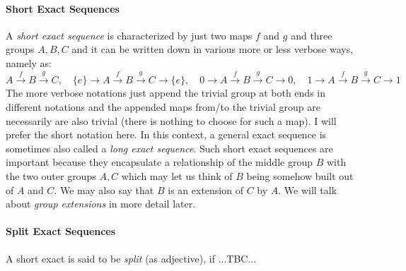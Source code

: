 

\paragraph{Short Exact Sequences}
A \emph{short exact sequence} is characterized by just two maps $f$ and $g$ and three groups $A,B,C$ and it can be written down in various more or less verbose ways, namely as:
\begin{equation}
 A \xrightarrow{f} B \xrightarrow{g} C,
 \quad 
 \{e\} \xrightarrow{} A \xrightarrow{f} B \xrightarrow{g} C \xrightarrow{} \{e\},
 \quad 
 0 \xrightarrow{} A \xrightarrow{f} B \xrightarrow{g} C \xrightarrow{} 0,
 \quad
 1 \xrightarrow{} A \xrightarrow{f} B \xrightarrow{g} C \xrightarrow{} 1
\end{equation}
The more verbose notations just append the trivial group at both ends in different notations and the appended maps from/to the trivial group are necessarily are also trivial (there is nothing to choose for such a map). I will prefer the short notation here. In this context, a general exact sequence is sometimes also called a \emph{long exact sequence}. Such short exact sequences are important because they encapsulate a relationship of the middle group $B$ with the two outer groups $A,C$ which may let us think of $B$ being somehow built out of $A$ and $C$. We may also say that $B$ is an extension of $C$ by $A$. We will talk about \emph{group extensions} in more detail later.



\paragraph{Split Exact Sequences}
A short exact is said to be \emph{split} (as adjective), if ...TBC...




